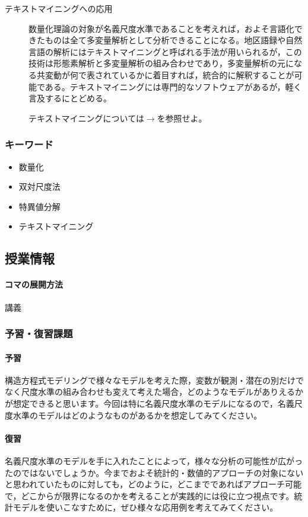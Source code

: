 \begin{description}
    \item[テキストマイニングへの応用] 数量化理論の対象が名義尺度水準であることを考えれば，およそ言語化できたものは全て多変量解析として分析できることになる。地区語録や自然言語の解析にはテキストマイニングと呼ばれる手法が用いられるが，この技術は形態素解析と多変量解析の組み合わせであり，多変量解析の元になる共変動が何で表されているかに着目すれば，統合的に解釈することが可能である。テキストマイニングには専門的なソフトウェアがあるが，軽く言及するにとどめる。
    \begin{flushright}
        テキストマイニングについては$\to$\citet{樋口耕一2020-04-06}を参照せよ。
    \end{flushright}

\end{description}
\subsubsection{キーワード}
\begin{itemize}
    \item 数量化
    \item 双対尺度法
    \item 特異値分解
    \item テキストマイニング
\end{itemize}
\subsection{授業情報}
\paragraph{コマの展開方法}
講義
\subsubsection{予習・復習課題}
\paragraph{予習} 構造方程式モデリングで様々なモデルを考えた際，変数が観測・潜在の別だけでなく尺度水準の組み合わせも変えて考えた場合，どのようなモデルがありえるかが想定できると思います。今回は特に名義尺度水準のモデルになるので，名義尺度水準のモデルはどのようなものがあるかを想定してみてください。
\paragraph{復習} 名義尺度水準のモデルを手に入れたことによって，様々な分析の可能性が広がったのではないでしょうか。今までおよそ統計的・数値的アプローチの対象にないと思われていたものに対しても，どのように，どこまでであればアプローチ可能で，どこからが限界になるのかを考えることが実践的には役に立つ視点です。統計モデルを使いこなすために，ぜひ様々な応用例を考えてみてください。